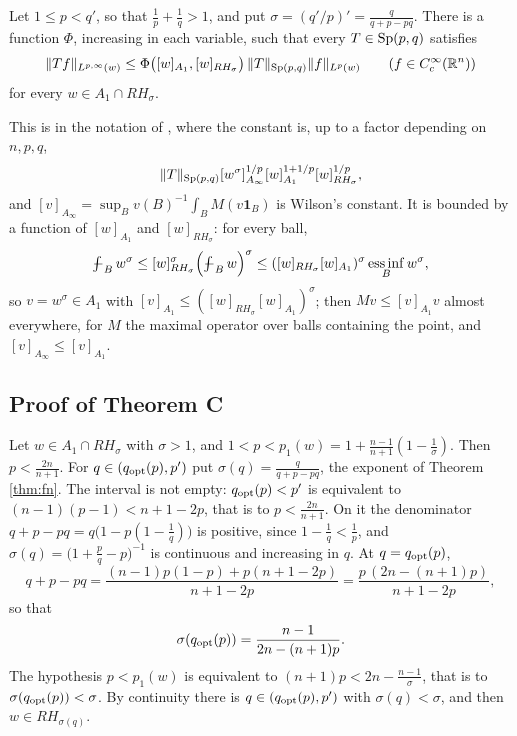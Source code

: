 \begin{theorem}[{\cite[Theorem 1.4]{FN19}}]\label{thm:fn}
Let $1\le p<q'$, so that $\frac1p+\frac1q>1$, and put $\sigma=(q'/p)'=\frac q{q+p-pq}$. There is a
function $\Phi$, increasing in each variable, such that every $T\in\mathrm{Sp}(p,q)$ satisfies
\[
\|Tf\|_{L^{p,\infty}(w)}\le\Phi\bigl([w]_{A_1},[w]_{RH_\sigma}\bigr)\,\|T\|_{\mathrm{Sp}(p,q)}\|f\|_{L^p(w)}
\qquad(f\in C^\infty_c(\mathbb{R}^n))
\]
for every $w\in A_1\cap RH_\sigma$.
\end{theorem}

This is \cite[Theorem 1.4]{FN19} in the notation of \cite[(9.2)]{BRS25}, where the constant is,
up to a factor depending on $n,p,q$,
\[
\|T\|_{\mathrm{Sp}(p,q)}[w^\sigma]_{A_\infty}^{1/p}[w]_{A_1}^{1+1/p}[w]_{RH_\sigma}^{1/p},
\]
and $[v]_{A_\infty}=\sup_Bv(B)^{-1}\int_BM(v\mathbf 1_B)$ is Wilson's constant. It is bounded by
a function of $[w]_{A_1}$ and $[w]_{RH_\sigma}$: for every ball,
\[
\fint_Bw^\sigma\le[w]_{RH_\sigma}^\sigma\Bigl(\fint_Bw\Bigr)^\sigma\le([w]_{RH_\sigma}[w]_{A_1})^\sigma
\operatorname*{ess\,inf}_Bw^\sigma ,
\]
so $v=w^\sigma\in A_1$ with $[v]_{A_1}\le([w]_{RH_\sigma}[w]_{A_1})^\sigma$; then $Mv\le[v]_{A_1}v$ almost
everywhere, for $M$ the maximal operator over balls containing the point, and
$[v]_{A_\infty}\le[v]_{A_1}$.

\subsection{Proof of Theorem C}\label{ssec:proofC}
Let $w\in A_1\cap RH_\sigma$ with $\sigma>1$, and $1<p<p_1(w)=1+\frac{n-1}{n+1}(1-\frac1\sigma)$. Then
$p<\frac{2n}{n+1}$. For $q\in(q_{\rm opt}(p),p')$ put $\sigma(q)=\frac q{q+p-pq}$, the exponent of Theorem
\ref{thm:fn}. The interval is not empty: $q_{\rm opt}(p)<p'$ is equivalent to
$(n-1)(p-1)<n+1-2p$, that is to $p<\frac{2n}{n+1}$. On it the denominator
$q+p-pq=q\bigl(1-p(1-\frac1q)\bigr)$ is positive, since $1-\frac1q<\frac1p$, and
$\sigma(q)=\bigl(1+\frac pq-p\bigr)^{-1}$ is continuous and increasing in $q$. At $q=q_{\rm opt}(p)$,
\[
q+p-pq=\frac{(n-1)p(1-p)+p(n+1-2p)}{n+1-2p}=\frac{p\,(2n-(n+1)p)}{n+1-2p},
\]
so that
\[
\sigma(q_{\rm opt}(p))=\frac{n-1}{2n-(n+1)p} .
\]
The hypothesis $p<p_1(w)$ is equivalent to $(n+1)p<2n-\frac{n-1}\sigma$, that is to
$\sigma(q_{\rm opt}(p))<\sigma$. By continuity there is $q\in(q_{\rm opt}(p),p')$ with $\sigma(q)<\sigma$,
and then $w\in RH_{\sigma(q)}$.

